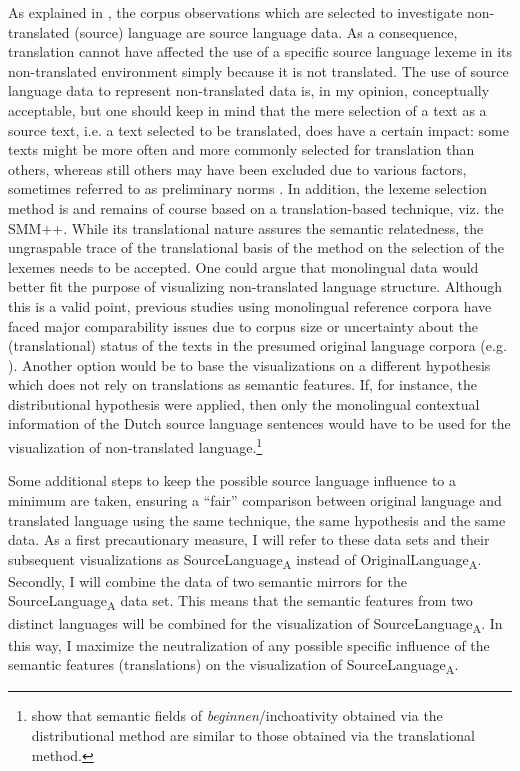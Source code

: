 As explained in , the corpus observations which are selected to investigate non-translated (source) language are source language data. As a consequence, translation cannot have affected the use of a specific source language lexeme in its non-translated environment simply because it is not translated. The use of source language data to represent non-translated data is, in my opinion, conceptually acceptable, but one should keep in mind that the mere selection of a text as a source text, i.e. a text selected to be translated, does have a certain impact: some texts might be more often and more commonly selected for translation than others, whereas still others may have been excluded due to various factors, sometimes referred to as preliminary norms \citep{toury_descriptive_1995}. In addition, the lexeme selection method is and remains of course based on a translation-based technique, viz. the SMM++. While its translational nature assures the semantic relatedness, the ungraspable trace of the translational basis of the method on the selection of the lexemes needs to be accepted. One could argue that monolingual data would better fit the purpose of visualizing non-translated language structure. Although this is a valid point, previous studies using monolingual reference corpora have faced major comparability issues due to corpus size or uncertainty about the (translational) status of the texts in the presumed original language corpora (e.g. \citealt{musolff_conceptual_2014}). Another option would be to base the visualizations on a different hypothesis which does not rely on translations as semantic features. If, for instance, the distributional hypothesis were applied, then only the monolingual contextual information of the Dutch source language sentences would have to be used for the visualization of non-translated language.\footnote{\citet{vandevoorde_distributional_2016} show that semantic fields of \textit{beginnen}\slash inchoativity obtained via the distributional method are similar to those obtained via the translational method.}

Some additional steps to keep the possible source language influence to a minimum are taken, ensuring a ``fair'' comparison between original language and translated language using the same technique, the same hypothesis and the same data. As a first precautionary measure, I will refer to these data sets and their subsequent visualizations as SourceLanguage\textsubscript{A} instead of OriginalLanguage\textsubscript{A}. Secondly, I will combine the data of two semantic mirrors for the SourceLanguage\textsubscript{A} data set. This means that the semantic features from two distinct languages will be combined for the visualization of SourceLanguage\textsubscript{A}. In this way, I maximize the neutralization of any possible specific influence of the semantic features (translations) on the visualization of SourceLanguage\textsubscript{A}.


